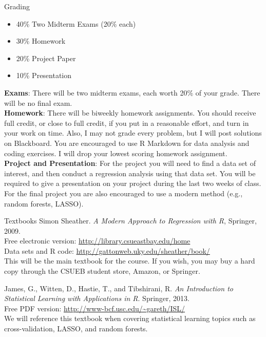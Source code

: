 \documentclass[10pt]{beamer}
\begin{document}
\begin{frame}{Grading}
\begin{itemize}
\item 40\% Two Midterm Exams (20\% each)
\item 30\% Homework
\item 20\% Project Paper 
\item 10\% Presentation
\end{itemize}
\end{frame}

\begin{frame}
\textbf{Exams}: There will be two midterm exams, each worth 20\% of your grade.  There will be no final exam.\\
\vspace{10pt}
\textbf{Homework}: There will be biweekly homework assignments.  You should receive full credit, or close to full credit, if you put in a reasonable effort, and turn in your work on time.  Also, I may not grade every problem, but I will post solutions on Blackboard.  You are encouraged to use R Markdown for data analysis and coding exercises.  I will drop your lowest scoring homework assignment.\\
\vspace{10pt}
\textbf{Project and Presentation}:  For the project you will need to find a data set of interest, and then conduct a regression analysis using that data set.  You will be required to give a presentation on your project during the last two weeks of class.  For the final project you are also encouraged to use a modern method (e.g., random forests, LASSO).
\end{frame}

\begin{frame}{Textbooks}
Simon Sheather. \emph{A Modern Approach to Regression with R}, Springer, 2009.\\
\vspace{4pt}
Free electronic version: \url{http://library.csueastbay.edu/home}\\
Data sets and R code: \url{http://gattonweb.uky.edu/sheather/book/}\\
\vspace{4pt}
This will be the main textbook for the course.  If you wish, you may buy a hard copy through the CSUEB student store, Amazon, or Springer.
\vspace{15pt}

James, G., Witten, D., Hastie, T., and Tibshirani, R. \emph{An Introduction to Statistical Learning with Applications in R}. Springer, 2013.\\
\vspace{4pt}
Free PDF version: \url{http://www-bcf.usc.edu/~gareth/ISL/}\\
\vspace{4pt}
We will reference this textbook when covering statistical learning topics such as cross-validation, LASSO, and random forests.  
\end{frame}
\end{document}
